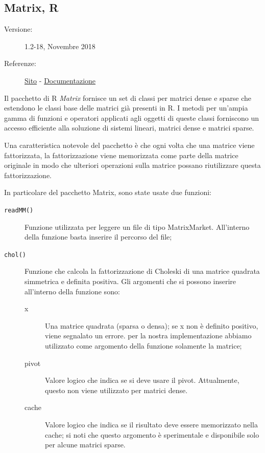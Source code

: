\documentclass[preprint,12pt]{elsarticle}
\begin{document}
\subsection{Matrix, R}
\medskip
\begin{description}
	\item[Versione:] 1.2-18, Novembre 2018
	\item[Referenze:] \href{http://matrix.r-forge.r-project.org}{Sito} - \href{https://www.rdocumentation.org/packages/Matrix}{Documentazione}
\end{description}

Il pacchetto di R \textit{Matrix} fornisce un set di classi per matrici dense e sparse che estendono le classi base delle matrici già presenti in R. I metodi per un'ampia gamma di funzioni e operatori applicati agli oggetti di queste classi forniscono un accesso efficiente alla soluzione di sistemi lineari, matrici dense e matrici sparse.

Una caratteristica notevole del pacchetto è che ogni volta che una matrice viene fattorizzata, la fattorizzazione viene memorizzata come parte della matrice originale in modo che ulteriori operazioni sulla matrice possano riutilizzare questa fattorizzazione.

In particolare del pacchetto Matrix, sono state usate due funzioni:

\begin{description}
	\item[\texttt{readMM()}] Funzione utilizzata per leggere un file di tipo MatrixMarket. All'interno della funzione basta inserire il percorso del file;
	\item[\texttt{chol()}] Funzione che calcola la fattorizzazione di Choleski di una matrice quadrata simmetrica e definita positiva. Gli argomenti che si possono inserire all'interno della funzione sono:
	\begin{description}
		\item[x] Una matrice quadrata (sparsa o densa); se x non è definito positivo, viene segnalato un errore. per la nostra implementazione abbiamo utilizzato come argomento della funzione solamente la matrice;
		\item[pivot] Valore logico che indica se si deve usare il pivot. Attualmente, questo non viene utilizzato per matrici dense.
		\item[cache] Valore logico che indica se il risultato deve essere memorizzato nella cache; si noti che questo argomento è sperimentale e disponibile solo per alcune matrici sparse.
	\end{description}
\end{description}
\end{document}
